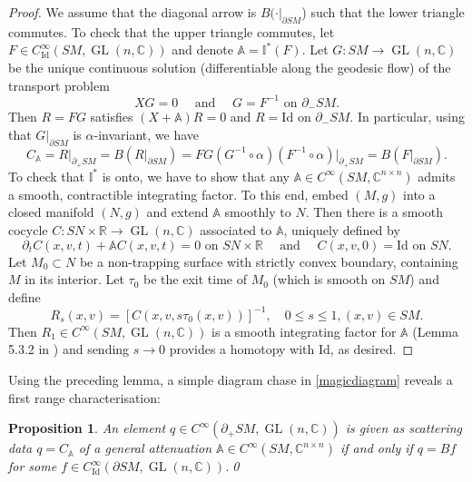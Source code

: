 \documentclass[JEP,XML,SOM,Unicode,published]{cedram}
\DeclareMathOperator{\GL}{GL}
\theoremstyle{plain}
\newtheorem{proposition}[theorem]{Proposition}
\theoremstyle{definition}
\newcommand{\A}{\mathbb{A}}
\newcommand{\I}{\mathbb{I}}
\newcommand{\R}{\mathbb{R}}
\newcommand{\C}{\mathbb{C}}
\newcommand{\Id}{\mathrm{Id}}
\newcommand{\1}{{\bf 1}}
\begin{document}
\begin{proof}
We assume that the diagonal arrow is $B(\cdot\vert_{\partial SM}$) such that the lower triangle commutes. To check that the upper triangle commutes, let $F\in C_\Id^\infty(SM,\GL(n,\C))$ and denote $\A = \I^*(F)$. Let $G:SM\to \GL(n,\C)$ be the unique continuous solution (differentiable along the geodesic flow) of the transport problem
\begin{equation*}
XG = 0 \quad \text{ and } \quad G = F^{-1} \text{ on } \partial_-SM.
\end{equation*}
Then $R=FG$ satisfies $(X+\A)R=0$ and $R=\Id$ on $
\partial_-SM$. In particular, using that $G\vert_{\partial SM}$ is $\alpha$-invariant, we have
\begin{equation*}
C_\A = R \vert_{\partial_+SM} = B(R\vert_{\partial SM}) = F G (G^{-1}\circ \alpha)(F^{-1}\circ\alpha)\vert_{\partial_+SM} = B(F\vert_{\partial SM}).
\end{equation*}
To check that $\I^*$ is onto, we have to show that any $\A\in C^\infty(SM,\C^{n\times n})$ admits a smooth, contractible integrating factor. To this end, embed $(M,g)$ into a closed manifold $(N,g)$ and extend $\A$ smoothly to $N$. Then there is a smooth cocycle $C:SN\times \R\to \GL(n,\C)$ associated to $\A$, uniquely defined by
\begin{equation*}
\partial_t C(x,v,t) + \A C(x,v,t) = 0 \text{ on } SN\times \R \quad \text{ and } \quad C(x,v,0)=\Id \text{ on } SN.
\end{equation*}
Let $M_0\subset N$ be a non-trapping surface with strictly convex boundary, containing $M$ in its interior. Let $\tau_0$ be the exit time of $M_0$ (which is smooth on $SM$) and define
\begin{equation*}
R_s(x,v) = [C(x,v,s\tau_0(x,v))]^{-1},\quad 0\le s \le 1, (x,v)\in SM.
\end{equation*}
Then $R_1\in C^\infty(SM,\GL(n,\C))$ is a smooth integrating factor for $\A$ (\cf Lemma 5.3.2 in \cite{PSU20}) and sending $s\to 0$ provides a homotopy with $\Id$, as desired.
\end{proof}

Using the preceding lemma, a simple diagram chase in \eqref{magicdiagram} reveals a first range characterisation:

\begin{proposition}
An element $q\in C^\infty(\partial_+SM,\GL(n,\C))$ is given as scattering data $q=C_\A$ of a general attenuation $\A\in C^\infty(SM,\C^{n\times n})$ if and only if $q=Bf$ for some $f\in C_\Id^\infty(\partial SM,\GL(n,\C))$.\qed
\end{proposition}
\end{document}
